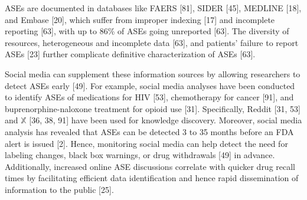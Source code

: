 \documentclass[referee,bst/sn-basic]{sn-jnl}%
\begin{document}
ASEs are documented in databases like FAERS [81], 
SIDER [45], 
MEDLINE [18], 
and Embase [20], 
which suffer from improper indexing [17]
and incomplete reporting [63],
with up to 86\% of ASEs going unreported [63].
The diversity of resources, heterogeneous and incomplete data [63], 
and patients' failure to report ASEs [23] 
further complicate definitive characterization of ASEs [63]. 


Social media can supplement these information sources by allowing researchers to detect ASEs early [49]. 
For example, social media analyses have been conducted to identify ASEs of medications for HIV [53], 
chemotherapy for cancer [91], 
and buprenorphine-naloxone treatment for opioid use [31]. 
Specifically, Reddit [31, 53] 
and $\mathbb{X}$ [36, 38, 91] 
have been used for knowledge discovery.
Moreover, social media analysis has revealed that ASEs can be detected 3 to 35 months before an FDA alert is issued [2]. 
Hence, monitoring social media can help detect the need for labeling changes, black box warnings, or drug withdrawals [49] 
in advance. 
Additionally, increased online ASE discussions correlate with quicker drug recall times by facilitating efficient data identification and hence rapid dissemination of information to the public [25]. 
\end{document}

